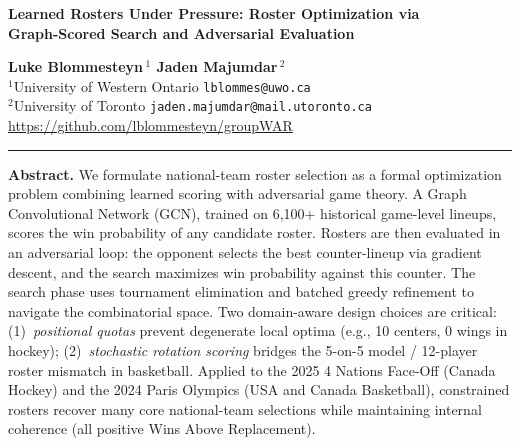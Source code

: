 \documentclass[11pt,letterpaper]{article}
\begin{document}
{\Large\bfseries Learned Rosters Under Pressure: Roster Optimization via\\
Graph-Scored Search and Adversarial Evaluation}

\vspace{0.5em}
{\bfseries Luke Blommesteyn\,$^1$ \quad Jaden Majumdar\,$^2$}\\[0.2em]
$^1$University of Western Ontario \quad \texttt{lblommes@uwo.ca}\\
$^2$University of Toronto \quad \texttt{jaden.majumdar@mail.utoronto.ca}\\
{\small\url{https://github.com/lblommesteyn/groupWAR}}

\vspace{0.4em}
{\color{gray!60}\hrule}
\vspace{0.6em}

\textbf{Abstract.}
We formulate national-team roster selection as a formal optimization
problem combining learned scoring with adversarial game theory.
A Graph Convolutional Network (GCN), trained on 6{,}100+ historical
game-level lineups, scores the win probability of any candidate
roster. Rosters are then evaluated in an adversarial loop: the
opponent selects the best counter-lineup via gradient descent, and the
search maximizes win probability against this counter. The search
phase uses tournament elimination and batched greedy refinement to
navigate the combinatorial space. Two domain-aware design choices are
critical: (1)~\emph{positional quotas} prevent degenerate local
optima (e.g., 10 centers, 0 wings in hockey); (2)~\emph{stochastic
rotation scoring} bridges the 5-on-5 model / 12-player roster
mismatch in basketball. Applied to the 2025 4 Nations Face-Off
(Canada Hockey) and the 2024 Paris Olympics (USA and Canada
Basketball), constrained rosters recover many core national-team
selections while maintaining internal coherence (all positive
Wins Above Replacement).

\vspace{0.2em}
\end{document}
